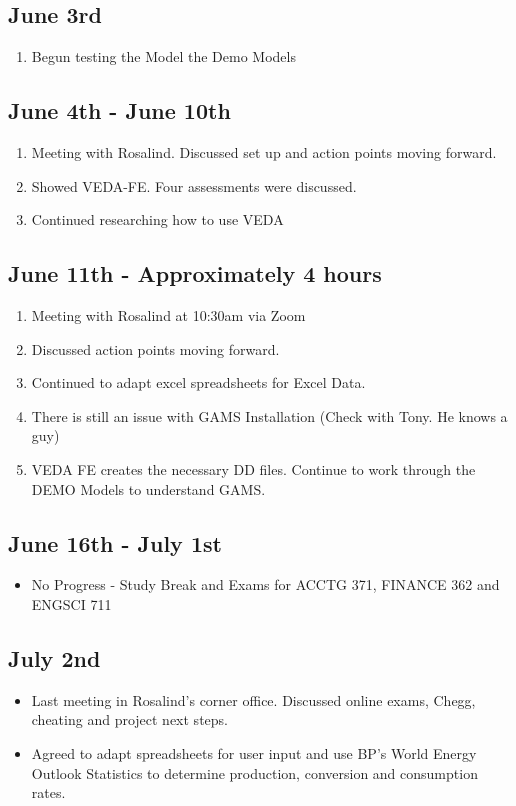 \documentclass[12pt]{article}
\begin{document}
\subsection{June 3rd}
\begin{enumerate}
	\item Begun testing the Model the Demo Models
\end{enumerate}
\subsection{June 4th - June 10th}
\begin{enumerate}
	\item Meeting with Rosalind. Discussed set up and action points moving forward.
	\item Showed VEDA-FE. Four assessments were discussed.
	\item Continued researching how to use VEDA
\end{enumerate}
\subsection{June 11th - Approximately 4 hours}
\begin{enumerate}
	\item Meeting with Rosalind at 10:30am via Zoom
	\item Discussed action points moving forward.
	\item Continued to adapt excel spreadsheets for Excel Data.
	\item There is still an issue with GAMS Installation (Check with Tony. He knows a guy)
	\item VEDA FE creates the necessary DD files. Continue to work through the DEMO Models to understand GAMS.
\end{enumerate}
\subsection{June 16th - July 1st}
\begin{itemize}
	\item No Progress - Study Break and Exams for ACCTG 371, FINANCE 362 and ENGSCI 711
\end{itemize}
\subsection{July 2nd}
\begin{itemize}
	\item Last meeting in Rosalind's corner office. Discussed online exams, Chegg, cheating and project next steps.
	\item Agreed to adapt spreadsheets for user input and use BP's World Energy Outlook Statistics to determine production, conversion and consumption rates.
\end{itemize}
\end{document}
